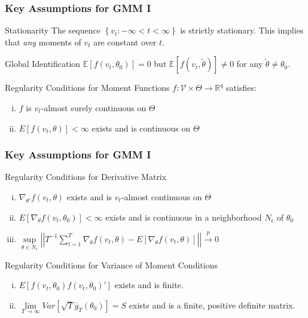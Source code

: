 \begin{frame}
  \frametitle{Key Assumptions for GMM I}

  \begin{block}{Stationarity}
    The sequence $\left\{ v_t\colon -\infty < t < \infty \right\}$ is strictly stationary.
    This implies that \emph{any} moments of $v_t$ are constant over $t$.
  \end{block}

  \begin{block}{Global Identification}
    $\mathbb{E}[f(v_t,\theta_0)]=0$ but $\mathbb{E}[f(v_t, \widetilde{\theta})] \neq 0$ for any $\widetilde{\theta} \neq \theta_0$.
  \end{block}

  \begin{block}{Regularity Conditions for Moment Functions}
$f\colon \mathcal{V}\times \Theta \rightarrow \mathbb{R}^q$ satisfies: 
	\begin{enumerate}[(i)]
		\item $f$ is $v_t$-almost surely continuous on $\Theta$
		\item $E[f(v_t, \theta)]<\infty$ exists and is continuous on $\Theta$
	\end{enumerate}
  \end{block}
\end{frame}
\begin{frame}
  \frametitle{Key Assumptions for GMM I}
  \begin{block}{Regularity Conditions for Derivative Matrix}
	\begin{enumerate}[(i)]
		\item $\nabla_{\theta'} f(v_t, \theta)$ exists and is $v_t$-almost continuous on $\Theta$ 
		\item $E[\nabla_{\theta}f(v_t, \theta_0)]<\infty$ exists and is continuous in a  neighborhood $N_\epsilon$ of $\theta_0$
		\item $\underset{\theta \in N_\epsilon}{\sup}\left| \left| T^{-1} \sum_{t=1}^T \nabla_\theta f(v_t, \theta) - E[\nabla_\theta f(v_t, \theta)]\right|\right| \overset{p}{\rightarrow} 0$
	\end{enumerate}
  \end{block}

  \begin{block}{Regularity Conditions for Variance of Moment Conditions}
\begin{enumerate}[(i)]
	\item $E[f(v_t, \theta_0)f(v_t, \theta_0)']$ exists and is finite.
	\item $\underset{T\rightarrow \infty}{\lim} Var\left[\sqrt{T}\bar{g}_T(\theta_0)\right]=S$ exists and is a finite, positive definite matrix.
\end{enumerate}
  \end{block}

\end{frame}

